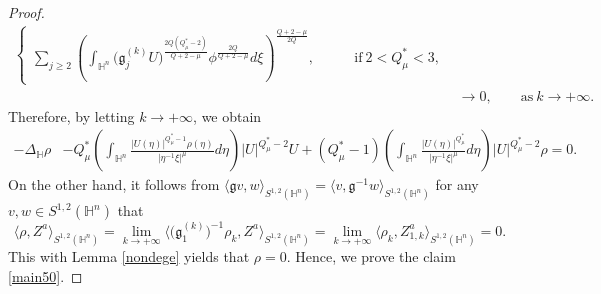 \documentclass[11pt]{article}
\begin{document}
\begin{proof}
\begin{align}
\begin{cases}
\displaystyle\sum\limits_{j\geq2} \left(\int_{\mathbb{H}^{n}}\Big( \mathfrak{g}_j^{(k)} U  \Big)^{\frac{2Q(Q_\mu^*-2)}{Q+2-\mu}}\phi^{\frac{2Q}{Q+2-\mu}} d\xi\right )^{\frac{Q+2-\mu}{2Q}}, \qquad &\mathrm{if}~2< Q_\mu^*<3,
\end{cases}
 \\
 &\longrightarrow  0,\qquad \mathrm{as} ~ k\rightarrow+\infty.
\end{align}
Therefore, by letting $k\rightarrow +\infty$, we obtain %
 \begin{align*}
  -\Delta_{\mathbb{H} } \rho&-Q^{\ast}_{\mu}\left(\int_{\mathbb{H}^{n}}\frac{|U(\eta)|^{Q^{\ast}_{\mu}-1}\rho(\eta)}
{|\eta^{-1}\xi|^{\mu}}{d}\eta\right)|U|^{Q^{\ast}_{\mu}-2}U+(Q^{\ast}_{\mu}-1)
\left(\int_{\mathbb{H}^{n}}\frac{|U(\eta)|^{Q^{\ast}_{\mu}}}{|\eta^{-1}\xi|^{\mu}}{d}\eta\right)
|U|^{Q^{\ast}_{\mu}-2}\rho
=0.%
\end{align*}
On the other hand, it follows from $\langle \mathfrak{g}v, w \rangle_{S^{1,2}(\mathbb{H}^{n})}=\langle v, \mathfrak{g}^{-1}w \rangle_{S^{1,2}(\mathbb{H}^{n})}$ for any $v,w\in S^{1,2}(\mathbb{H}^{n})$ that
\begin{equation*}
  \langle \rho, Z^a \rangle_{S^{1,2}(\mathbb{H}^{n})}=\lim\limits_{k\rightarrow+\infty}\Big\langle \Big(\mathfrak{g}_1^{(k)}\Big)^{-1}\rho_k, Z^a \Big\rangle_{S^{1,2}(\mathbb{H}^{n})}=\lim\limits_{k\rightarrow+\infty}\langle \rho_k, Z_{1,k}^a \rangle_{S^{1,2}(\mathbb{H}^{n})}= 0.
\end{equation*}
This with Lemma \ref{nondege} yields that $\rho=0$. Hence, we prove the claim \eqref{main50}.


\end{proof}
\end{document}
